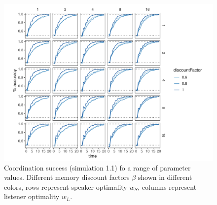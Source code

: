 \documentclass[11pt, floatsintext]{apa6}
\begin{document}
 \begin{figure}
\centering
    \includegraphics[scale=.9]{arbitrariness_grid.pdf}
  \caption{Coordination success (simulation 1.1) fo a range of parameter values. Different memory discount factors $\beta$ shown in different colors, rows represent speaker optimality $w_S$, columns represent listener optimality $w_L$.}
  \label{fig:arbitrariness_grid}
\end{figure}
\end{document}
